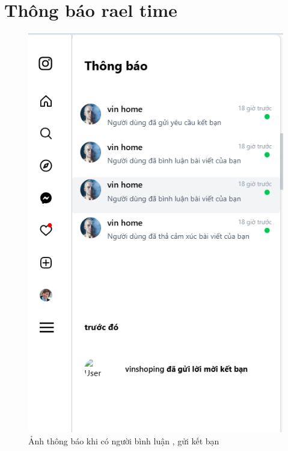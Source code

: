 \FloatBarrier %

\section{Thông báo rael time}
\begin{figure}[H]
    \centering
    \includegraphics[width=1\textwidth]{img/instagram/có thông báo .png}
    \caption{Ảnh thông báo khi có người bình luận , gửi kết bạn}
\end{figure}

\FloatBarrier %
